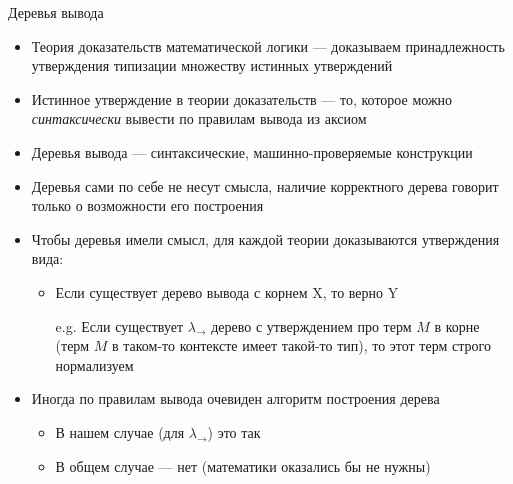 
    \appendix

    \begin{frame}{Деревья вывода}
        \begin{itemize}
            \item Теория доказательств математической логики --- доказываем принадлежность утверждения типизации множеству истинных утверждений
            \item Истинное утверждение в теории доказательств --- то, которое можно \emph{синтаксически} вывести по правилам вывода из аксиом
            \item Деревья вывода --- синтаксические, машинно-проверяемые конструкции
            \item Деревья сами по себе не несут смысла, наличие корректного дерева говорит только о возможности его построения
            \item Чтобы деревья имели смысл, для каждой теории доказываются утверждения вида:
            \begin{itemize}
                \item Если существует дерево вывода с корнем X, то верно Y
                \item[e.g.] Если существует $\lambda_\to$ дерево с утверждением про терм $M$ в корне (терм $M$ в таком-то контексте имеет такой-то тип), то этот терм строго нормализуем
            \end{itemize}
            \item Иногда по правилам вывода очевиден алгоритм построения дерева
            \begin{itemize}
                \item В нашем случае (для $\lambda_\to$) это так
                \item В общем случае --- нет (математики оказались бы не нужны)
            \end{itemize}
        \end{itemize}
    \end{frame}

